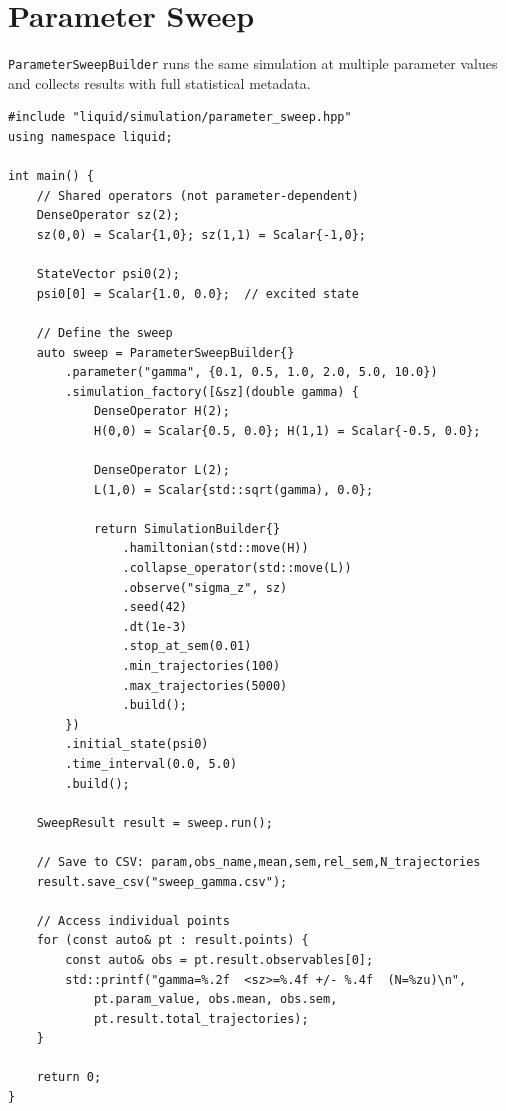 \documentclass[11pt,a4paper,twoside]{book}
\newcommand{\code}[1]{\texttt{\small#1}}
\theoremstyle{definition}
\theoremstyle{remark}
\begin{document}
\section{Parameter Sweep}
\label{sec:parameter-sweep}

\code{ParameterSweepBuilder} runs the same simulation at multiple
parameter values and collects results with full statistical metadata.

\begin{verbatim}
#include "liquid/simulation/parameter_sweep.hpp"
using namespace liquid;

int main() {
    // Shared operators (not parameter-dependent)
    DenseOperator sz(2);
    sz(0,0) = Scalar{1,0}; sz(1,1) = Scalar{-1,0};

    StateVector psi0(2);
    psi0[0] = Scalar{1.0, 0.0};  // excited state

    // Define the sweep
    auto sweep = ParameterSweepBuilder{}
        .parameter("gamma", {0.1, 0.5, 1.0, 2.0, 5.0, 10.0})
        .simulation_factory([&sz](double gamma) {
            DenseOperator H(2);
            H(0,0) = Scalar{0.5, 0.0}; H(1,1) = Scalar{-0.5, 0.0};

            DenseOperator L(2);
            L(1,0) = Scalar{std::sqrt(gamma), 0.0};

            return SimulationBuilder{}
                .hamiltonian(std::move(H))
                .collapse_operator(std::move(L))
                .observe("sigma_z", sz)
                .seed(42)
                .dt(1e-3)
                .stop_at_sem(0.01)
                .min_trajectories(100)
                .max_trajectories(5000)
                .build();
        })
        .initial_state(psi0)
        .time_interval(0.0, 5.0)
        .build();

    SweepResult result = sweep.run();

    // Save to CSV: param,obs_name,mean,sem,rel_sem,N_trajectories
    result.save_csv("sweep_gamma.csv");

    // Access individual points
    for (const auto& pt : result.points) {
        const auto& obs = pt.result.observables[0];
        std::printf("gamma=%.2f  <sz>=%.4f +/- %.4f  (N=%zu)\n",
            pt.param_value, obs.mean, obs.sem,
            pt.result.total_trajectories);
    }

    return 0;
}
\end{verbatim}

\end{document}
